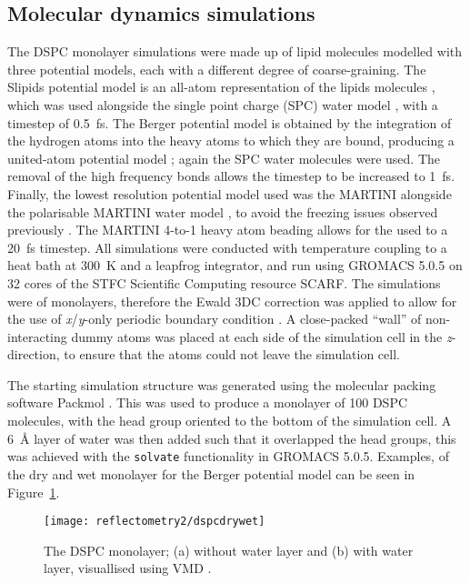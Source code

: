 \subsection{Molecular dynamics simulations}
The DSPC monolayer simulations were made up of lipid molecules modelled with three potential models, each with a different degree of coarse-graining.
The Slipids potential model is an all-atom representation of the lipids molecules \cite{jambeck_derivation_2012}, which was used alongside the single point charge (SPC) water model \cite{berendsen_missing_1987}, with a timestep of \SI{0.5}{\femto\second}.
The Berger potential model is obtained by the integration of the hydrogen atoms into the heavy atoms to which they are bound, producing a united-atom potential model \cite{berger_molecular_1997}; again the SPC water molecules were used.
The removal of the high frequency  bonds allows the timestep to be increased to \SI{1}{\femto\second}.
Finally, the lowest resolution potential model used was the MARTINI \cite{marrink_martini_2007} alongside the polarisable MARTINI water model \cite{yesylevskyy_polarizable_2010}, to avoid the freezing issues observed previously \cite{koutsioubas_combined_2016}.
The MARTINI 4-to-1 heavy atom beading allows for the used to a \SI{20}{\femto\second} timestep.
All simulations were conducted with temperature coupling to a heat bath at \SI{300}{\kelvin} and a leapfrog integrator, and run using GROMACS 5.0.5 \cite{berendsen_gromacs_1995,lindahl_gromacs_2001,van_der_spoel_gromacs_2005,hess_gromacs_2008} on 32 cores of the STFC Scientific Computing resource SCARF.
The simulations were of monolayers, therefore the Ewald 3DC correction was applied to allow for the use of \emph{x}/\emph{y}-only periodic boundary condition \cite{yeh_ewald_1999}.
A close-packed ``wall'' of non-interacting dummy atoms was placed at each side of the simulation cell in the \emph{z}-direction, to ensure that the atoms could not leave the simulation cell.

The starting simulation structure was generated using the molecular packing software Packmol \cite{martinez_packmol_2009}.
This was used to produce a monolayer of \num{100} DSPC molecules, with the head group oriented to the bottom of the simulation cell.
A \SI{6}{\angstrom} layer of water was then added such that it overlapped the head groups, this was achieved with the \texttt{solvate} functionality in GROMACS 5.0.5.
Examples, of the dry and wet monolayer for the Berger potential model can be seen in Figure~\ref{fig:drywet}.
%
\begin{figure}
    \centering
    \texttt{[image: reflectometry2/dspcdrywet]}
    \caption{The DSPC monolayer; (a) without water layer and (b) with water layer, visuallised using VMD \cite{humphrey_vmd_1996}.}
    \label{fig:drywet}
\end{figure}
%

